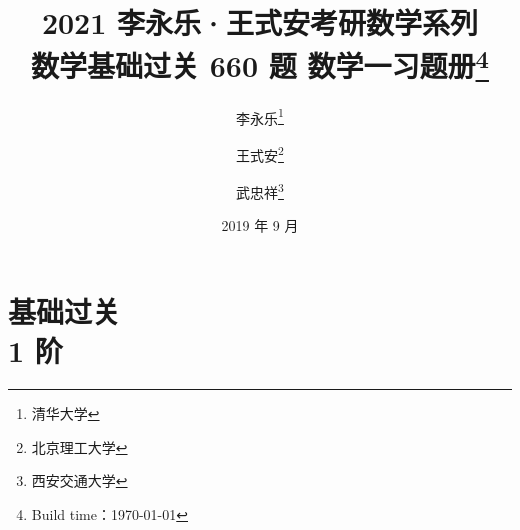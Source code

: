 \documentclass[zihao=5]{ctexbook}
\title{2021 李永乐·王式安考研数学系列\\数学基础过关 660 题 数学一习题册\thanks{Build time：\today}}
\author{李永乐\thanks{清华大学} \and 王式安\thanks{北京理工大学} \and 武忠祥\thanks{西安交通大学}}
\date{2019 年 9 月}
\begin{document}
\frontmatter
\maketitle
\tableofcontents
\mainmatter
\part{基础过关\\1 阶}

\end{document}
